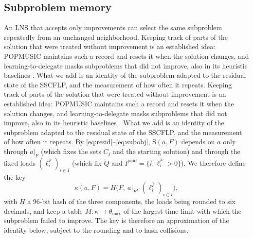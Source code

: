 \subsection{Subproblem memory}\label{sec:memory}
An LNS that accepts only improvements can select the same subproblem repeatedly from an
unchanged neighborhood. Keeping track of parts of the solution that were treated without
improvement is an established idea: POPMUSIC \citep{taillard2002} maintains such a record and
resets it when the solution changes, and learning-to-delegate masks subproblems that did not improve, also in its
heuristic baselines \citep{li2021delegate}. What we add is an identity of the subproblem adapted
to the residual state of the SSCFLP, and the measurement of how often it repeats. Keeping track of parts of the solution that were treated without
improvement is an established idea: POPMUSIC \citep{taillard2002} maintains such a record and
resets it when the solution changes, and learning-to-delegate masks subproblems that did not improve, also in its
heuristic baselines \citep{li2021delegate}. What we add is an identity of the subproblem adapted
to the residual state of the SSCFLP, and the measurement of how often it repeats. By \eqref{eq:resid}--\eqref{eq:subobj}, $\mathrm{S}(a,F)$ depends on $a$
only through $a|_F$ (which fixes the sets $C_j$ and the starting solution) and through the fixed
loads $(\ell^{\bar F}_i)_{i\in I}$ (which fix $\tilde Q$ and $I^{\mathrm{paid}}=\{i:\ell^{\bar F}_i>0\}$).
We therefore define the key
\begin{equation}\label{eq:key}
\kappa(a,F)=H\bigl(F,\ a|_F,\ (\ell^{\bar F}_i)_{i\in I}\bigr),
\end{equation}
with $H$ a 96-bit hash of the three components, the loads being rounded to six decimals, and keep
a table $M:\kappa\mapsto\theta_{\max}$ of the largest time limit with which the subproblem failed
to improve. The key is therefore an approximation of the identity below, subject to the rounding
and to hash collisions.

